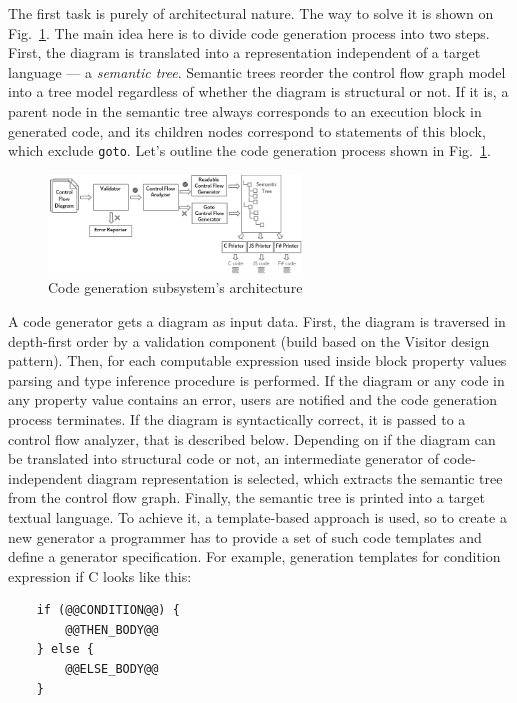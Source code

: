 \documentclass[conference]{IEEEtran}
\begin{document}
The first task is purely of architectural nature. The way to solve it is shown on Fig.~\ref{image:generatorsArchitecture}. The main idea here is to divide code generation process into two steps. First, the diagram is translated into a representation independent of a target language --- a \textit{semantic tree}. Semantic trees reorder the control flow graph model into a tree model regardless of whether the diagram is structural or not. If it is, a parent node in the semantic tree always corresponds to an execution block in generated code, and its children nodes correspond to statements of this block, which exclude \texttt{goto}. Let's outline the code generation process shown in Fig.~\ref{image:generatorsArchitecture}.

\begin{figure}[ht]
    \centering
    \includegraphics[width=0.6\textwidth]{TS_Generators_Architecture.png}
    \caption{Code generation subsystem's architecture}
    \label{image:generatorsArchitecture}
\end{figure}

A code generator gets a diagram as input data. First, the diagram is traversed in depth-first order by a validation component (build based on the Visitor design pattern). Then, for each computable expression used inside block property values parsing and type inference procedure is performed. If the diagram or any code in any property value contains an error, users are notified and the code generation process terminates. If the diagram is syntactically correct, it is passed to a control flow analyzer, that is described below. Depending on if the diagram can be translated into structural code or not, an intermediate generator of code-independent diagram representation is selected, which extracts the semantic tree from the control flow graph. Finally, the semantic tree is printed into a target textual language. To achieve it, a template-based approach is used, so to create a new generator a programmer has to provide a set of such code templates and define a generator specification. For example, generation templates for condition expression if C looks like this:
\begin{verbatim}
    if (@@CONDITION@@) {
        @@THEN_BODY@@
    } else {
        @@ELSE_BODY@@
    }
\end{verbatim}
\end{document}
